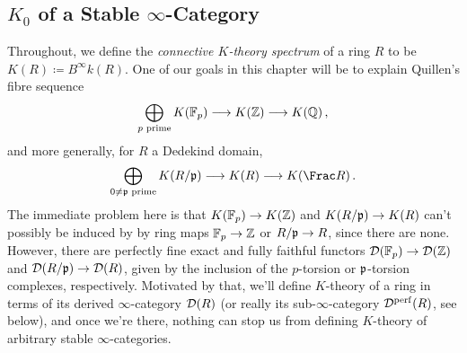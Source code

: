 \documentclass[a4paper, 10pt, oneside, DIV=9, chapterprefix=true, numbers=enddot,bibliography=totoc]{scrbook}
\begin{document}
\subsection{\texorpdfstring{$K_0$}{K0} of a Stable \texorpdfstring{$\infty$}{Infinity}-Category}
Throughout, we define the \emph{connective $K$-theory spectrum} of a ring $R$ to be $K(R)\coloneqq B^\infty k(R)$. One of our goals in this chapter will be to explain Quillen's fibre sequence
\begin{equation*}
 \bigoplus_{p\text{ prime}}K(\IF_p)\morphism  K(\IZ)\morphism K(\IQ)\,,
\end{equation*}
and more generally, for $R$ a Dedekind domain,
\begin{equation*}
	\bigoplus_{0\neq \pp\text{ prime}}K(R/\pp)\morphism  K(R)\morphism K(\Frac R)\,.
\end{equation*}
The immediate problem here is that $K(\IF_p)\morphism K(\IZ)$ and $K(R/\pp)\morphism K(R)$ can't possibly be induced by by ring maps $\IF_p\morphism \IZ$ or $R/\pp\morphism R$, since there are none. However, there are perfectly fine exact and fully faithful functors $\Dd(\IF_p)\morphism \Dd(\IZ)$ and $\Dd(R/\pp)\morphism \Dd(R)$, given by the inclusion of the $p$-torsion or $\mathfrak{p}$-torsion complexes, respectively. Motivated by that, we'll define $K$-theory of a ring in terms of its derived $\infty$-category $\mathcal{D}(R)$ (or really its sub-$\infty$-category $\mathcal{D}^{\mathrm{perf}}(R)$, see below), and once we're there, nothing can stop us from defining $K$-theory of arbitrary stable $\infty$-categories.
\end{document}
